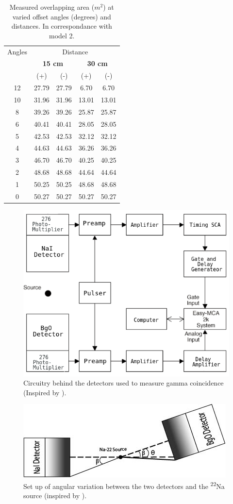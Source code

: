 \documentclass[12pt, letterpaper, twocolumn]{article}
\newcommand\mcc[1]{\multicolumn{2}{c}{#1}}
\begin{document}
\begin{table}[H]
\centering
\begin{tabular}{ccccc}
\toprule
{Angles} & \multicolumn{4}{c}{Distance}\\\cmidrule{2-5}
& \mcc{\textbf{15 cm}}
& \mcc{\textbf{30 cm}}\\
\cmidrule{2-3} \cmidrule{4-5}
& {(+)}  & {(-)} & {(+)} & {(-)} \\
\midrule
12 & 27.79 & 27.79 & 6.70 & 6.70\\\hline
10 & 31.96 & 31.96 & 13.01 & 13.01\\\hline
8 & 39.26 & 39.26 & 25.87 & 25.87\\\hline
6 & 40.41 & 40.41 & 28.05 & 28.05\\\hline
5 & 42.53 & 42.53 & 32.12 & 32.12\\\hline
4 & 44.63 & 44.63 & 36.26 & 36.26\\\hline
3 & 46.70 & 46.70 & 40.25 & 40.25\\\hline
2 & 48.68 & 48.68 & 44.64 & 44.64\\\hline
1 & 50.25 & 50.25 & 48.68 & 48.68\\\hline
0 & 50.27 & 50.27 & 50.27 & 50.27\\\hline
\bottomrule
\end{tabular}
\caption{Measured overlapping area ($m^{2}$) at varied offset angles
(degrees) and distances. In correspondance with model 2.}
\label{table:model2_table}
\end{table}
\begin{figure}[H]
    \centering
    \includegraphics[width=.45\textwidth]{Figures/gamma_coin_circuitry.png}
    \caption{Circuitry behind the detectors used to measure gamma coincidence
    (Inspired by \cite{Experiment_Set_Up:1}).}
    \label{figure:circuitry}
\end{figure}
\begin{figure}[H]
     \centering
     \includegraphics[width=.45\textwidth]{Figures/detector_set_up.jpg}
     \caption{Set up of angular variation between the two detectors and the
     \textsuperscript{22}Na source (inspired by \cite{Experiment_Set_Up:2}).}
     \label{figure:set_up}
\end{figure}
\end{document}
